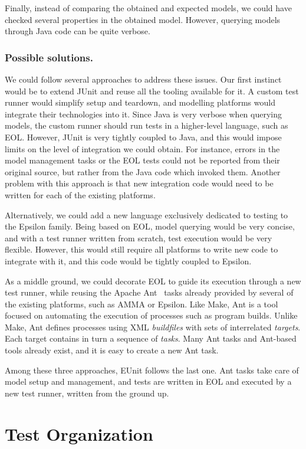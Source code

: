 Finally, instead of comparing the obtained and expected models, we could have checked several properties in the obtained model. However, querying models through Java code can be quite verbose.

\subsubsection{Possible solutions.} We could follow several approaches to address these issues. Our first instinct would be to extend JUnit and reuse all the tooling available for it. A custom test runner would simplify setup and teardown, and modelling platforms would integrate their technologies into it. Since Java is very verbose when querying models, the custom runner should run tests in a higher-level language, such as EOL. However, JUnit is very tightly coupled to Java, and this would impose limits on the level of integration we could obtain. For instance, errors in the model management tasks or the EOL tests could not be reported from their original source, but rather from the Java code which invoked them.  Another problem with this approach is that new integration code would need to be written for each of the existing platforms.

Alternatively, we could add a new language exclusively dedicated to testing to the Epsilon family.  Being based on EOL, model querying would be very concise, and with a test runner written from scratch, test execution would be very flexible. However, this would still require all platforms to write new code to integrate with it, and this code would be tightly coupled to Epsilon.

As a middle ground, we could decorate EOL to guide its execution through a new test runner, while reusing the Apache Ant~\cite{ANT} tasks already provided by several of the existing platforms, such as AMMA or Epsilon. Like Make, Ant is a tool focused on automating the execution of processes such as program builds. Unlike Make, Ant defines processes using XML \emph{buildfiles} with sets of interrelated \emph{targets}. Each target contains in turn a sequence of \emph{tasks}. Many Ant tasks and Ant-based tools already exist, and it is easy to create a new Ant task.

Among these three approaches, EUnit follows the last one. Ant tasks take care of model setup and management, and tests are written in EOL and executed by a new test runner, written from the ground up.

\section{Test Organization}
\label{sec:eunit-test-organization}

